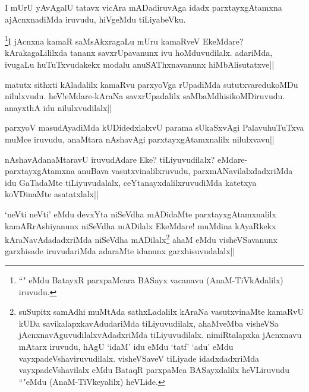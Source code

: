 \begin{artha}
I mUrU yAvAgalU tatavx vicAra mADadiruvAga idadx parxtayxgAtamxna ajAcnxnadiMda iruvudu, hiVgeMdu tiLiyabeVku. 
\end{artha}


\begin{artha}
\footnote[1]{``\stext " eMdu BatayxR parxpaMcara BASayx vacanavu (AnaM-TiVkAdalilx) iruvudu.}I jAcnxna kamaR saMsAkxragaLu mUru kamaRveV EkeMdare? kArakagaLililxda tananx savxrUpavanunx ivu hoMduvudilalx. adariMda, ivugaLu huTuTxvudakekx modalu anuSAThxnavanunx hiMbAlisutatxve||
\end{artha}

\begin{artha}%
matutx sithxti kAladalilx kamaRvu parxyoVga rUpadiMda sututxvaredukoMDu nilulxvudu. heV!eMdare-kAraNa savxrUpadalilx saMbaMdhisikoMDiruvudu. anayxthA idu nilulxvudilalx||
\end{artha}

\begin{artha}
parxyoV masudAyadiMda kUDidedxlalxvU parama sUkaSxvAgi PalavuhuTuTxva muMce iruvudu, anaMtara nAshavAgi parxtayxgAtamxnalilx nilulxvavu||
\end{artha}

\begin{artha}
nAshavAdanaMtaravU iruvudAdare Eke? tiLiyuvudilalx? eMdare- parxtayxgAtamxna anuBava vasutxvinalilxruvudu, parxmANavilalxdadxriMda idu GaTadaMte tiLiyuvudalalx, ceYtanayxdalilxruvudiMda katetxya koVDinaMte asatatxlalx||
\end{artha}


\begin{artha}
`neVti neVti' eMdu devxYta niSeVdha mADidaMte parxtayxgAtamxnalilx kamARrAshiyanunx niSeVdha mADilalx EkeMdare! muMdina kAyaRkekx kAraNavAdadadxriMda niSeVdha mADilalx\footnote[1]{suSupitx samAdhi muMtAda sathxLadalilx kAraNa vasutxvinaMte kamaRvU kUDa savikalapxkavAdudariMda tiLiyuvudilalx, ahaMveMba visheVSa jAcnxnavAguvudilalxvAdadxriMda tiLiyuvudilalx. nimiRtalapxka jAcnxnavu mAtarx iruvudu, hAgU `idaM' idu eMdu `tatf' `adu' eMdu vayxpadeVshaviruvudilalx. visheVSaveV tiLiyade idadxdadxriMda vayxpadeVshavilalx eMdu BataqR parxpaMca BASayxdalilx heVLiruvudu ``\stext "eMdu (AnaM-TiVkeyalilx) heVLide.} ahaM eMdu visheVSavanunx garxhisade iruvudariMda adaraMte idanunx garxhisuvudalalx||
\end{artha}

